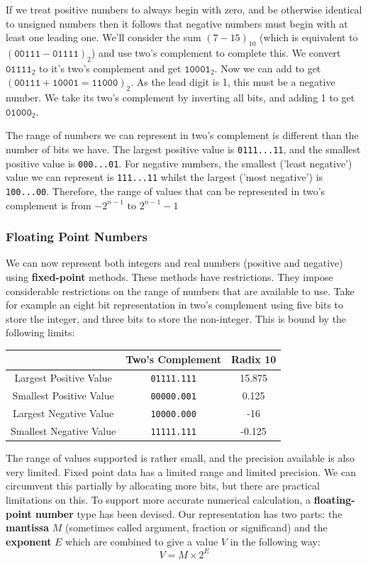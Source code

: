 \documentclass{article}
\begin{document}
	If we treat positive numbers to always begin with zero, and be otherwise identical to unsigned numbers then it follows that negative numbers must begin with at least one leading one. We'll consider the sum $(7 - 15)_{10}$ (which is equivalent to $(\texttt{00111} - \texttt{01111})_{2}$) and use two's complement to complete this. We convert $\texttt{01111}_{2}$ to it's two's complement and get $\texttt{10001}_{2}$. Now we can add to get $(\texttt{00111} + \texttt{10001} = \texttt{11000})_{2}$. As the lead digit is 1, this must be a negative number. We take its two's complement by inverting all bits, and adding 1 to get $\texttt{01000}_{2}$. 
	
	\par The range of numbers we can represent in two's complement is different than the number of bits we have. The largest positive value is \texttt{0111...11}, and the smallest positive value is \texttt{000...01}. For negative numbers, the smallest ('least negative') value we can represent is \texttt{111...11} whilst the largest ('most negative') is \texttt{100...00}. Therefore, the range of values that can be represented in two's complement is from $-2^{n-1}$ to $2^{n-1} - 1$
	
	\subsubsection{Floating Point Numbers}
	We can now represent both integers and real numbers (positive and negative) using \textbf{fixed-point} methods. These methods have restrictions. They impose considerable restrictions on the range of numbers that are available to use. Take for example an eight bit representation in two's complement using five bits to store the integer, and three bits to store the non-integer. This is bound by the following limits:
	
	\begin{tabular}{c | c c}
	& Two's Complement & Radix 10 \\ \hline
	Largest Positive Value & \texttt{01111.111} & 15.875 \\
	Smallest Positive Value & \texttt{00000.001} & 0.125 \\
	Largest Negative Value & \texttt{10000.000} & -16 \\
	Smallest Negative Value & \texttt{11111.111} & -0.125
	\end{tabular}
	
	\par 	
	The range of values supported is rather small, and the precision available is also very limited. Fixed point data has a limited range and limited precision. We can circumvent this partially by allocating more bits, but there are practical limitations on this. To support more accurate numerical calculation, a \textbf{floating-point number} type has been devised. Our representation has two parts: the \textbf{mantissa} $M$ (sometimes called argument, fraction or significand) and the \textbf{exponent} $E$ which are combined to give a value $V$ in the following way:
	\[ V = M \times 2^{E} \]
	
\end{document}
